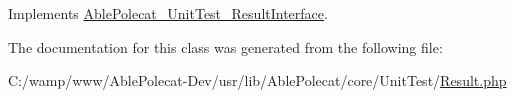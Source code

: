 Implements \hyperlink{interface_able_polecat___unit_test___result_interface_a73d4c4adb8e41947fceaef0bd012ef0d}{Able\+Polecat\+\_\+\+Unit\+Test\+\_\+\+Result\+Interface}.



The documentation for this class was generated from the following file\+:\begin{DoxyCompactItemize}
\item 
C\+:/wamp/www/\+Able\+Polecat-\/\+Dev/usr/lib/\+Able\+Polecat/core/\+Unit\+Test/\hyperlink{_unit_test_2_result_8php}{Result.\+php}\end{DoxyCompactItemize}
